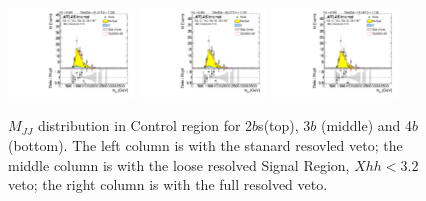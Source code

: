 \begin{figure}[htbp!]
\begin{center}
\includegraphics[width=0.3\textwidth,angle=-90]{figures/boosted/AppendixResveto/Moriond_FourTag_Control_mHH_l.pdf}
\includegraphics[width=0.3\textwidth,angle=-90]{figures/boosted/AppendixResveto/Moriond_resveto_FourTag_Control_mHH_l.pdf}
\includegraphics[width=0.3\textwidth,angle=-90]{figures/boosted/AppendixResveto/Moriond_fullresveto_FourTag_Control_mHH_l.pdf}\\
  \caption{ $M_{JJ}$ distribution in Control region for 2$b$s(top), 3$b$ (middle) and 4$b$ (bottom). The left column is with the stanard resovled veto; the middle column is with the loose resolved Signal Region, $Xhh < 3.2$ veto; the right column is with the full resolved veto.}
\label{fig:app-resveto-cr}
\end{center}
\end{figure}


